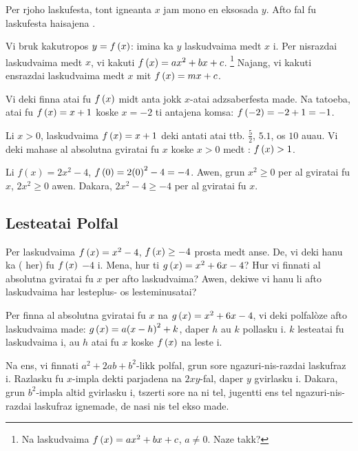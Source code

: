 Per rjoho laskufesta, tont igneanta \(x\) jam mono en eksosada \(y\).
Afto fal fu laskufesta haisajena .

Vi bruk kakutropos \(y = f\left(x\right)\): imina ka \(y\) laskudvaima medt \(x\) i.
Per nisrazdai laskudvaima medt \(x\), vi kakuti
\(f \left(x\right) = ax^2 + bx + c\). \footnote{Na  laskudvaima
	\(f \left(x\right) = ax^2 + bx + c\), \(a \neq 0\). Naze takk?}
Najang, vi kakuti ensrazdai laskudvaima medt \(x\) mit \(f \left(x\right) = mx + c\).

Vi deki finna atai fu \(f \left(x\right)\) midt anta jokk \(x\)-atai adzsaberfesta made.
Na tatoeba, atai fu \(f \left(x\right) = x + 1\) koske \(x = -2\) ti antajena komsa: \(f \left(-2\right) = -2 + 1 = -1\).

Li \(x > 0\), laskudvaima \(f \left(x\right) = x + 1\) deki antati atai ttb. \(\frac{5}{2}\), \(5.1\), os \(10\) auau.
Vi deki mahase al absolutna gviratai fu \(x\) koske \(x > 0\) medt : \(f \left(x\right) > 1\).

\begin{example}
	Li \(f\left(x\right) = 2x^2 - 4\), \(f\left(0\right) = 2{\left(0\right)}^2 - 4 = -4\). Awen, grun
	\(x^2 \geq 0\) per al gviratai fu \(x\), \(2x^2 \geq 0\) awen. Dakara,
	\(2x^2 - 4 \geq -4\) per al gviratai fu \(x\).
\end{example}

\subsection{Lesteatai Polfal}

Per laskudvaima \(f \left(x\right) = x^2 - 4\), \(f\left(x\right) \geq - 4\) prosta medt anse. De, vi deki hanu
ka  ( her) fu \(f\left(x\right)\) \(-4\) i. Mena, hur ti
\(g \left(x\right) = x^2+6x-4\)? Hur vi finnati al absolutna gviratai fu \(x\) per afto laskudvaima?
Awen, dekiwe vi hanu li afto laskudvaima har lesteplus- os lesteminusatai?

Per finna al absolutna gviratai fu \(x\) na \(g \left(x\right)=x^2+6x-4\), vi deki polfalòze afto
laskudvaima  made: \(g \left(x\right) = a{\left(x-h\right)}^2+k\), daper
\(h\) au \(k\) pollasku i. \(k\) lesteatai fu laskudvaima i, au \(h\) atai fu \(x\) koske \(f \left(x\right)\)
na leste i.

Na ens, vi finnati \(a^2 + 2ab + b^2\)-likk polfal, grun sore ngazuri-nis-razdai laskufraz i.
Razlasku fu \(x\)-impla dekti parjadena na \(2xy\)-fal, daper \(y\) gvirlasku i.
Dakara, grun \(b^2\)-impla altid gvirlasku i, tszerti sore na ni tel, jugentti ens tel ngazuri-nis-razdai
laskufraz ignemade, de nasi nis tel ekso made.

